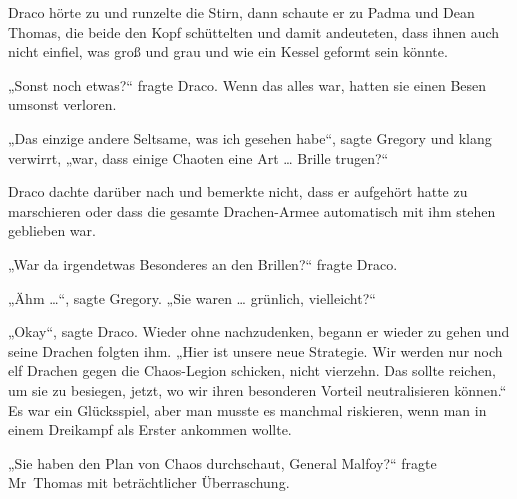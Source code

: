 Draco hörte zu und runzelte die Stirn, dann schaute er zu Padma und Dean Thomas, die beide den Kopf schüttelten und damit andeuteten, dass ihnen auch nicht einfiel, was groß und grau und wie ein Kessel geformt sein könnte.

„Sonst noch etwas?“ fragte Draco. Wenn das alles war, hatten sie einen Besen umsonst verloren.

„Das einzige andere Seltsame, was ich gesehen habe“, sagte Gregory und klang verwirrt, „war, dass einige Chaoten eine Art … Brille trugen?“

Draco dachte darüber nach und bemerkte nicht, dass er aufgehört hatte zu marschieren oder dass die gesamte Drachen-Armee automatisch mit ihm stehen geblieben war.

„War da irgendetwas Besonderes an den Brillen?“ fragte Draco.

„Ähm …“, sagte Gregory.
„Sie waren … grünlich, vielleicht?“

„Okay“, sagte Draco. Wieder ohne nachzudenken, begann er wieder zu gehen und seine Drachen folgten ihm.
„Hier ist unsere neue Strategie. Wir werden nur noch elf Drachen gegen die Chaos-Legion schicken, nicht vierzehn. Das sollte reichen, um sie zu besiegen, jetzt, wo wir ihren besonderen Vorteil neutralisieren können.“ Es war ein Glücksspiel, aber man musste es manchmal riskieren, wenn man in einem Dreikampf als Erster ankommen wollte.

„Sie haben den Plan von Chaos durchschaut, General Malfoy?“ fragte Mr~Thomas mit beträchtlicher Überraschung.

